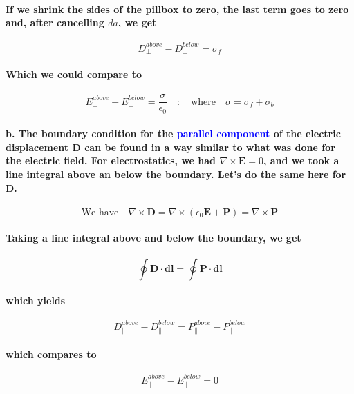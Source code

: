 \documentclass{article}
\begin{document}
\paragraph{If we shrink the sides of the pillbox to zero, the last term goes to zero and, after cancelling $da$, we get}
\begin{equation*}
    D_{\perp}^{above}-D_{\perp}^{below}=\sigma_f
\end{equation*}
\paragraph{Which we could compare to}
\begin{equation*}
    E_{\perp}^{above}-E_{\perp}^{below}=\frac{\sigma}{\epsilon_0}\quad:\quad \text{where} \quad \sigma=\sigma_f+\sigma_b
\end{equation*}
\paragraph{b. The boundary condition for the \textcolor{blue}{parallel component} of the electric displacement $\boldsymbol{D}$ can be found in a way similar to what was done for the electric field. For electrostatics, we had $\nabla\times\boldsymbol{E}=0$, and we took a line integral above an below the boundary. Let's do the same here for $\boldsymbol{D}$.}
\begin{equation*}
    \text{We have}\quad \nabla\times\boldsymbol{D}=\nabla\times(\epsilon_0\boldsymbol{E}+\boldsymbol{P})=\nabla\times\boldsymbol{P}
\end{equation*}
\paragraph{Taking a line integral above and below the boundary, we get}
\begin{equation*}
    \oint\boldsymbol{D}\cdot\boldsymbol{dl}=\oint\boldsymbol{P}\cdot\boldsymbol{dl}
\end{equation*}
\paragraph{which yields}
\begin{equation*}
    D_{\parallel}^{above}-D_{\parallel}^{below}=P_{\parallel}^{above}-P_{\parallel}^{below}
\end{equation*}
\paragraph{which compares to}
\begin{equation*}
    E_{\parallel}^{above}-E_{\parallel}^{below}=0
\end{equation*}
\end{document}
